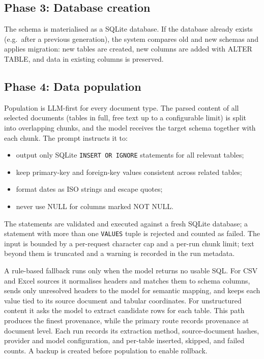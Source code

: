 \documentclass[11pt,a4paper]{article}
\begin{document}
\subsection{Phase 3: Database creation}
The schema is materialised as a SQLite database. If the database already exists (e.g.\ after a previous generation), the system compares old and new schemas and applies migration: new tables are created, new columns are added with ALTER TABLE, and data in existing columns is preserved.

\subsection{Phase 4: Data population}
Population is LLM-first for every document type. The parsed content of all selected documents (tables in full, free text up to a configurable limit) is split into overlapping chunks, and the model receives the target schema together with each chunk. The prompt instructs it to:
\begin{itemize}
  \item output only SQLite \texttt{INSERT OR IGNORE} statements for all relevant tables;
  \item keep primary-key and foreign-key values consistent across related tables;
  \item format dates as ISO strings and escape quotes;
  \item never use NULL for columns marked NOT NULL.
\end{itemize}
The statements are validated and executed against a fresh SQLite database; a statement with more than one \texttt{VALUES} tuple is rejected and counted as failed. The input is bounded by a per-request character cap and a per-run chunk limit; text beyond them is truncated and a warning is recorded in the run metadata.

A rule-based fallback runs only when the model returns no usable SQL. For CSV and Excel sources it normalises headers and matches them to schema columns, sends only unresolved headers to the model for semantic mapping, and keeps each value tied to its source document and tabular coordinates. For unstructured content it asks the model to extract candidate rows for each table. This path produces the finest provenance, while the primary route records provenance at document level. Each run records its extraction method, source-document hashes, provider and model configuration, and per-table inserted, skipped, and failed counts. A backup is created before population to enable rollback.
\end{document}
